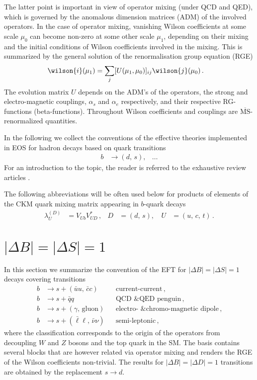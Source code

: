 The latter point
is important in view of operator mixing (under QCD and QED), which is governed by
the anomalous dimension matrices (ADM) of the involved operators. In the case of
operator mixing, vanishing Wilson coefficients at some scale $\mu_0$ can become 
non-zero at some other scale $\mu_1$, depending on their mixing and the initial
conditions of Wilson coefficients involved in the mixing. This is summarized
by the general solution of the renormalisation group equation (RGE)
\begin{align}
  \wilson{i}(\mu_1) & = \sum_j [U(\mu_1, \mu_0)]_{ij} \wilson{j}(\mu_0)\,.
\end{align}
The evolution matrix $U$ depends on the ADM's of the operators, the strong
and electro-magnetic couplings, $\alpha_s$ and $\alpha_e$ respectively, and
their respective RG-functions (beta-functions). Throughout Wilson coefficients
and couplings are $\overline{\text{MS}}$-renormalized quantities.

In the following we collect the conventions of the effective theories implemented
in EOS for hadron decays based on quark transitions
\begin{align}
  b & \to (d,\, s), & \ldots
\end{align}
For an introduction to the topic, the reader is referred to the exhaustive review
articles \cite{Buchalla:1995vs, Buras:1998raa}. 

The following abbreviations will be often used below for products of elements
of the CKM quark mixing matrix appearing in $b$-quark decays
\begin{align}
  \lambda_U^{(D)} & = V_{Ub}^{} V_{UD}^* \,, &
  D & = (d,\,s), \, &
  U & = (u,\,c,\,t) \,.
\end{align}

%
%

\section{$|\Delta B| = |\Delta S| = 1$}

In this section we summarize the convention of the EFT for $|\Delta B| = |\Delta S| = 1$
decays covering transitions
\begin{align*}
  b & \to s + (\bar{u}u,\, \bar{c}c)           && \mbox{current-current} \,,
\\
  b & \to s + \bar{q}q                         && \mbox{QCD \& QED penguin} \,,
\\
  b & \to s + (\gamma,\, \mbox{gluon})         && \mbox{electro- \& chromo-magnetic dipole} \,,
\\
  b & \to s + (\bar{\ell}\ell,\, \bar{\nu}\nu) && \mbox{semi-leptonic} \,,
\end{align*}
where the classification corresponds to the origin of the operators from 
decoupling $W$ and $Z$ bosons and the top quark in the SM. The basis contains several
blocks that are however related via operator mixing and renders the RGE of the
Wilson coefficients non-trivial. The results for $|\Delta B| = |\Delta D| = 1$
transitions are obtained by the replacement $s\to d$.
 
